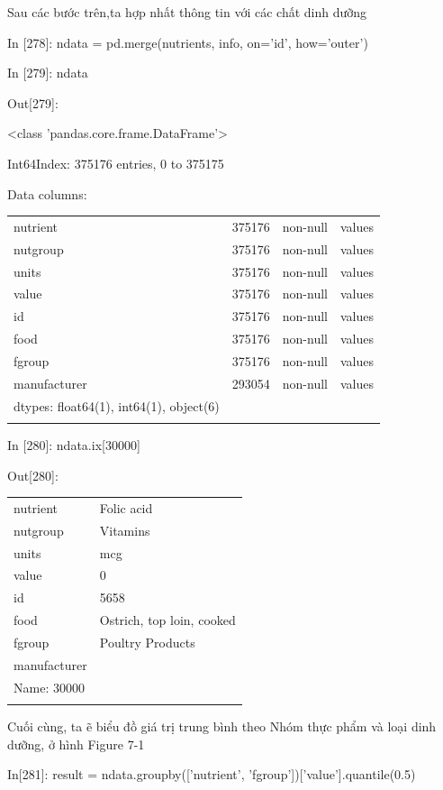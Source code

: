 \par\textup{Sau các bước trên,ta hợp nhất thông tin với các chất dinh dưỡng}
\par\quad\textup{In [278]: ndata = pd.merge(nutrients, info, on='id', how='outer')}
\par\quad\textup{In [279]: ndata}
\par\quad\textup{Out[279]:}
\par\quad\textup{<class 'pandas.core.frame.DataFrame'>}
\par\quad\textup{Int64Index: 375176 entries, 0 to 375175}
\par\quad\textup{Data columns:}
\par\quad\begin{tabular}{llll}
nutrient& 375176& non-null& values\\
nutgroup &375176& non-null &values\\
units& 375176 &non-null& values\\
value& 375176 &non-null &values\\
id &375176& non-null &values\\
food &375176& non-null& values\\
fgroup &375176 &non-null& values\\
manufacturer &293054 &non-null& values\\
dtypes: float64(1), int64(1), object(6)\\
\par\end{tabular}
\par\quad\textup{In [280]: ndata.ix[30000]}
\par\quad\textup{Out[280]:}
\par\quad\begin{tabular}{ll}
nutrient &Folic acid\\
nutgroup &Vitamins\\
units &mcg\\
value &0\\
id &5658\\
food &Ostrich, top loin, cooked\\
fgroup &Poultry Products\\
manufacturer\\
Name: 30000\\
\par\end{tabular}
\par\textup{Cuối cùng, ta ẽ biểu đồ giá trị trung bình theo Nhóm thực phẩm và loại dinh dưỡng, ở  hình Figure 7-1}
\par\quad\textup{In[281]: result = ndata.groupby(['nutrient', 'fgroup'])['value'].quantile(0.5)}

